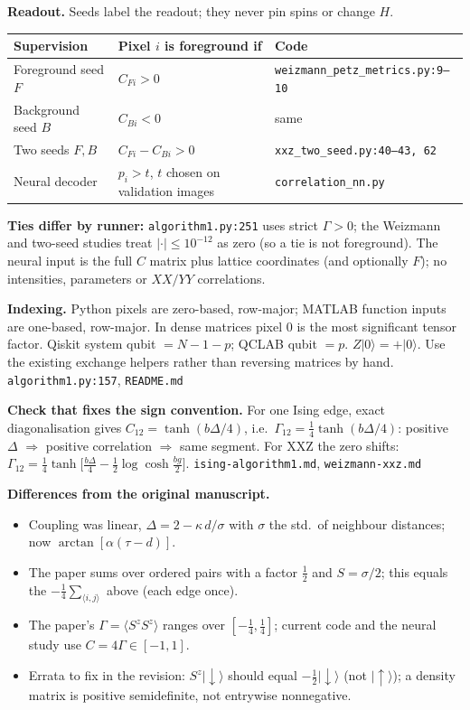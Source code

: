 \documentclass[10pt]{article}
\newcommand{\code}[1]{\texttt{\small #1}}
\begin{document}
\textbf{Readout.} Seeds label the readout; they never pin spins or change $H$.

\begin{center}\small
\begin{tabular}{@{}lll@{}}
\toprule
Supervision & Pixel $i$ is foreground if & Code \\
\midrule
Foreground seed $F$ & $C_{Fi}>0$ & \code{weizmann\_petz\_metrics.py:9--10} \\
Background seed $B$ & $C_{Bi}<0$ & same \\
Two seeds $F,B$ & $C_{Fi}-C_{Bi}>0$ & \code{xxz\_two\_seed.py:40--43, 62} \\
Neural decoder & $p_i>t$, $t$ chosen on validation images & \code{correlation\_nn.py} \\
\bottomrule
\end{tabular}
\end{center}
\textbf{Ties differ by runner:} \code{algorithm1.py:251} uses strict $\Gamma>0$; the Weizmann and two-seed studies treat $|\cdot|\le10^{-12}$ as zero (so a tie is not foreground).
The neural input is the full $C$ matrix plus lattice coordinates (and optionally $F$); no intensities, parameters or $XX/YY$ correlations.

\textbf{Indexing.}
Python pixels are zero-based, row-major; MATLAB function inputs are one-based, row-major.
In dense matrices pixel 0 is the most significant tensor factor. Qiskit system qubit $=N-1-p$; QCLAB qubit $=p$.
$Z\lvert0\rangle=+\lvert0\rangle$. Use the existing exchange helpers rather than reversing matrices by hand.
\hfill\code{algorithm1.py:157}, \code{README.md}

\textbf{Check that fixes the sign convention.}
For one Ising edge, exact diagonalisation gives $C_{12}=\tanh(b\Delta/4)$, i.e.\ $\Gamma_{12}=\tfrac14\tanh(b\Delta/4)$:
positive $\Delta$ $\Rightarrow$ positive correlation $\Rightarrow$ same segment.
For XXZ the zero shifts: $\Gamma_{12}=\tfrac14\tanh\!\big[\tfrac{b\Delta}{4}-\tfrac12\log\cosh\tfrac{bg}{2}\big]$.
\hfill\code{ising-algorithm1.md}, \code{weizmann-xxz.md}

\textbf{Differences from the original manuscript.}
\begin{itemize}
\item Coupling was linear, $\Delta=2-\kappa\,d/\sigma$ with $\sigma$ the std.\ of neighbour distances; now $\arctan[\alpha(\tau-d)]$.
\item The paper sums over ordered pairs with a factor $\tfrac12$ and $S=\sigma/2$; this equals the $-\tfrac14\sum_{\langle i,j\rangle}$ above (each edge once).
\item The paper's $\Gamma=\langle S^zS^z\rangle$ ranges over $[-\tfrac14,\tfrac14]$; current code and the neural study use $C=4\Gamma\in[-1,1]$.
\item Errata to fix in the revision: $S^z\lvert\downarrow\rangle$ should equal $-\tfrac12\lvert\downarrow\rangle$ (not $\lvert\uparrow\rangle$); a density matrix is positive semidefinite, not entrywise nonnegative.
\end{itemize}
\end{document}
